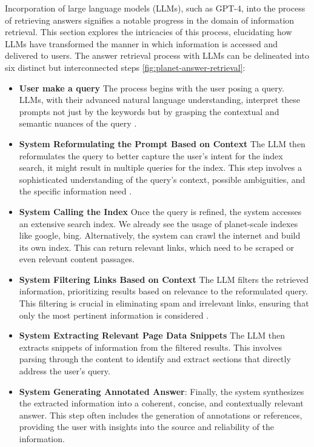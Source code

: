 \documentclass{article}
\begin{document}
Incorporation of large language models (LLMs), such as GPT-4, into the process of retrieving answers signifies a notable progress in the domain of information retrieval. This section explores the intricacies of this process, elucidating how LLMs have transformed the manner in which information is accessed and delivered to users. The answer retrieval process with LLMs can be delineated into six distinct but interconnected steps \ref{fig:planet-answer-retrieval}:

\begin{itemize}
    \item \textbf{User make a query}  The process begins with the user posing a query. LLMs, with their advanced natural language understanding, interpret these prompts not just by the keywords but by grasping the contextual and semantic nuances of the query .
    \item \textbf{System Reformulating the Prompt Based on Context} The LLM then reformulates the query to better capture the user's intent for the index search, it might result in multiple queries for the index. This step involves a sophisticated understanding of the query's context, possible ambiguities, and the specific information need .
    \item \textbf{System Calling the Index} Once the query is refined, the system accesses an extensive search index. We already see the usage of planet-scale indexes like google, bing. Alternatively, the system can crawl the internet and build its own index. This can return relevant links, which need to be scraped or even relevant content passages. 
    \item \textbf{System Filtering Links Based on Context} The LLM filters the retrieved information, prioritizing results based on relevance to the reformulated query. This filtering is crucial in eliminating spam and irrelevant links, ensuring that only the most pertinent information is considered .
    \item \textbf{System Extracting Relevant Page Data Snippets} The LLM then extracts snippets of information from the filtered results. This involves parsing through the content to identify and extract sections that directly address the user's query.
    \item \textbf{System Generating Annotated Answer}: Finally, the system synthesizes the extracted information into a coherent, concise, and contextually relevant answer. This step often includes the generation of annotations or references, providing the user with insights into the source and reliability of the information.
\end{itemize}
\end{document}
